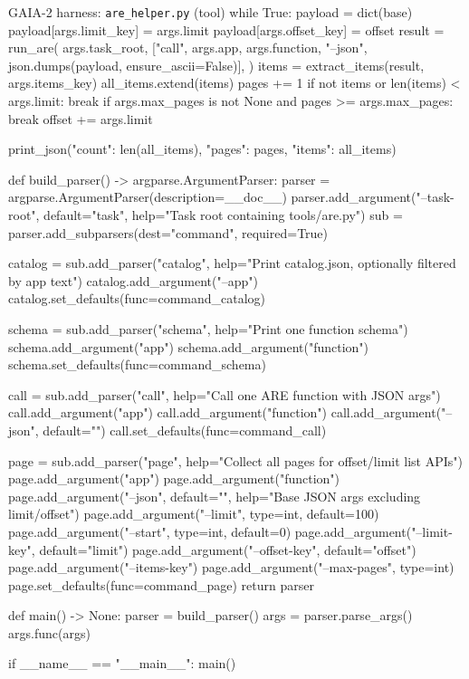 \begin{promptbox}{GAIA-2 harness: \texttt{are\_helper.py} (tool)}
    while True:
        payload = dict(base)
        payload[args.limit_key] = args.limit
        payload[args.offset_key] = offset
        result = run_are(
            args.task_root,
            ["call", args.app, args.function, "--json", json.dumps(payload, ensure_ascii=False)],
        )
        items = extract_items(result, args.items_key)
        all_items.extend(items)
        pages += 1
        if not items or len(items) < args.limit:
            break
        if args.max_pages is not None and pages >= args.max_pages:
            break
        offset += args.limit

    print_json({"count": len(all_items), "pages": pages, "items": all_items})


def build_parser() -> argparse.ArgumentParser:
    parser = argparse.ArgumentParser(description=__doc__)
    parser.add_argument("--task-root", default="task", help="Task root containing tools/are.py")
    sub = parser.add_subparsers(dest="command", required=True)

    catalog = sub.add_parser("catalog", help="Print catalog.json, optionally filtered by app text")
    catalog.add_argument("--app")
    catalog.set_defaults(func=command_catalog)

    schema = sub.add_parser("schema", help="Print one function schema")
    schema.add_argument("app")
    schema.add_argument("function")
    schema.set_defaults(func=command_schema)

    call = sub.add_parser("call", help="Call one ARE function with JSON args")
    call.add_argument("app")
    call.add_argument("function")
    call.add_argument("--json", default="{}")
    call.set_defaults(func=command_call)

    page = sub.add_parser("page", help="Collect all pages for offset/limit list APIs")
    page.add_argument("app")
    page.add_argument("function")
    page.add_argument("--json", default="{}", help="Base JSON args excluding limit/offset")
    page.add_argument("--limit", type=int, default=100)
    page.add_argument("--start", type=int, default=0)
    page.add_argument("--limit-key", default="limit")
    page.add_argument("--offset-key", default="offset")
    page.add_argument("--items-key")
    page.add_argument("--max-pages", type=int)
    page.set_defaults(func=command_page)
    return parser


def main() -> None:
    parser = build_parser()
    args = parser.parse_args()
    args.func(args)


if __name__ == "__main__":
    main()
\end{promptbox}

